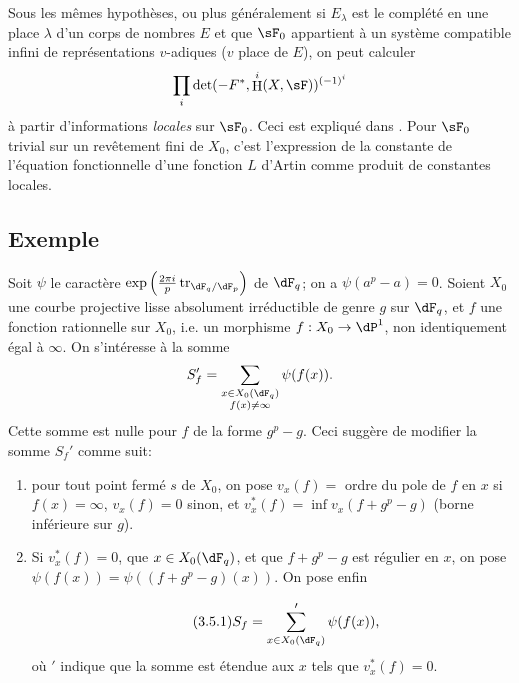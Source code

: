 \documentclass[oneside]{book}
\DeclareMathOperator{\h}{H}
\DeclareMathOperator{\tr}{tr}
\theoremstyle{sga-source}
\theoremstyle{sga-source-dash}
\theoremstyle{sga-source-dotdash}
\theoremstyle{sga-source-number-note-dash}
\theoremstyle{sga-source-note-number-dotdash}
\theoremstyle{sga-source-example-dotdash}
\theoremstyle{sga-source-inline-number}
\theoremstyle{sga-source-bare-number}
\theoremstyle{sga-source}
\newcommand{\PrintPage}[1]{}\newcommand{\MathPage}[1]{}\newcommand{\PrintCite}[2]{#1}\newcommand{\var}[3]{#1}
\begin{document}
Sous les mêmes hypothèses, ou plus généralement si $E_\lambda$ est le 
complété en une place $\lambda$ d'un corps de nombres $E$ et que $\sF_0$ 
appartient à un système compatible infini de représentations $v$-adiques 
($v$ place de $E$), on peut calculer 
\[
  \prod_i \det(-F^\ast,\h^i(X,\sF))^{(-1)^i} 
\]
à partir d'informations \emph{locales} sur $\sF_0$. Ceci est expliqué dans 
\cite{de73}. Pour $\sF_0$ trivial sur un revêtement fini de $X_0$, c'est 
l'expression de la constante de l'équation fonctionnelle d'une fonction $L$ 
d'Artin comme produit de constantes locales. 





\subsection{Exemple}\label{VI:3-5}

Soit $\psi$ le caractère 
$\exp\left(\frac{2\pi i}{p} \tr_{\dF_q/\dF_p}\right)$ de $\dF_q$; on a 
$\var{\psi(a^p-a)=0}{\psi(a^p-a)=1}{S45-SOL-0760}$. Soient $X_0$ une courbe projective lisse absolument 
irréductible de genre $g$ sur $\dF_q$, et $f$ une fonction rationnelle sur 
$X_0$, i.e. un morphisme $f:X_0 \to \dP^1$, non identiquement égal à 
$\infty$. On s'intéresse à la somme 
\[
  S_f' = \sum_{\substack{x\in X_0(\dF_q) \\ f(x)\ne \infty}} \psi(f(x)) 
  \text{.}
\]
\var{Cette somme est nulle pour $f$ de la forme $g^p-g$.}{Pour $f$ de la forme $g^p-g$, cette somme est égale à $\#\{x\in X_0(\dF_q)\mid f(x)\ne\infty\}$.}{S45-SOL-0763} Ceci suggère de 
modifier la somme $S_f'$ comme suit: 
\begin{enumerate}[\indent a)]
  \item \var{pour tout point fermé $s$}{pour tout point fermé $x$}{S45-SOL-0765} de $X_0$, on pose $v_x(f) = $ ordre du 
    \var{pole de $f$}{pôle de $f$}{S45-SOL-0766} en $x$ si $f(x)=\infty$, $v_x(f)=0$ sinon, et 
    $v_x^\ast(f) = \inf v_x(f+g^p-g)$ (borne inférieure sur $g$). 
  \item Si $v_x^\ast(f)=0$, que $x\in X_0(\dF_q)$, et que $f+g^p-g$ est 
    régulier en $x$, on pose $\psi(f(x)) = \psi((f+g^p-g)(x))$. On pose enfin 
    \PrintPage{191}
\begin{equation*}\tag{3.5.1}\label{VI:eq:3-5-1}
      S_f = \sum'_{x\in X_0(\dF_q)} \psi(f(x)) \text{,}
    \end{equation*}
    où $\prime$ indique que la somme est étendue aux $x$ tels que 
    $v_x^\ast(f)=0$. 
\end{enumerate}
\end{document}
